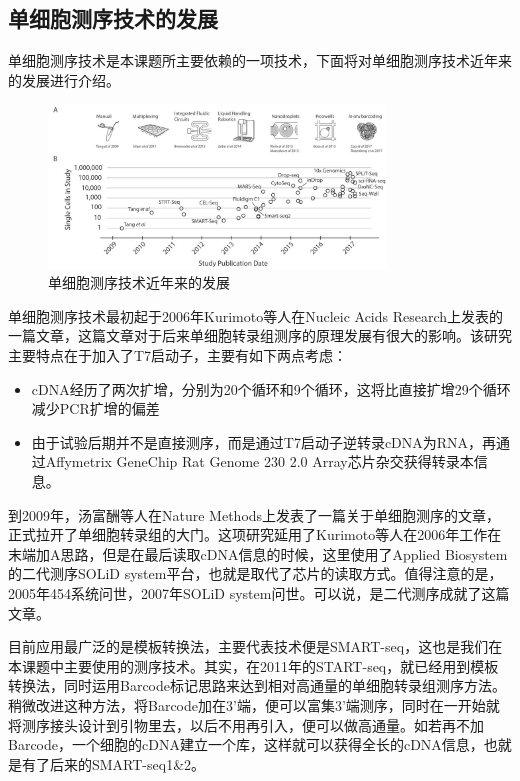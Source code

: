 \subsection{单细胞测序技术的发展}
  单细胞测序技术是本课题所主要依赖的一项技术，下面将对单细胞测序技术近年来的发展进行介绍。
\begin{figure}[!htb]
  \centering
  \includegraphics[width=0.8\textwidth]{figs/scseq-development.jpeg}
  \caption{单细胞测序技术近年来的发展}
  \label{fig:scseq-development}
\end{figure}

  单细胞测序技术最初起于2006年Kurimoto等人在Nucleic Acids Research上发表的一篇文章\cite{kurimoto2006improved}，这篇文章对于后来单细胞转录组测序的原理发展有很大的影响。该研究主要特点在于加入了T7启动子，主要有如下两点考虑：
\begin{itemize}
    \item cDNA经历了两次扩增，分别为20个循环和9个循环，这将比直接扩增29个循环减少PCR扩增的偏差
    \item 由于试验后期并不是直接测序，而是通过T7启动子逆转录cDNA为RNA，再通过Affymetrix GeneChip Rat Genome 230 2.0 Array芯片杂交获得转录本信息。
\end{itemize}

  到2009年，汤富酬等人在Nature Methods上发表了一篇关于单细胞测序的文章\cite{tang2009mrna}，正式拉开了单细胞转录组的大门。这项研究延用了Kurimoto等人在2006年工作\cite{kurimoto2006improved}在末端加A思路，但是在最后读取cDNA信息的时候，这里使用了Applied Biosystem的二代测序SOLiD system平台，也就是取代了芯片的读取方式。值得注意的是，2005年454系统问世，2007年SOLiD system问世。可以说，是二代测序成就了这篇文章。

  目前应用最广泛的是模板转换法，主要代表技术便是SMART-seq\cite{ramskold2012full,picelli2013smart}，这也是我们在本课题中主要使用的测序技术。其实，在2011年的START-seq\cite{islam2011characterization}，就已经用到模板转换法，同时运用Barcode标记思路来达到相对高通量的单细胞转录组测序方法。稍微改进这种方法，将Barcode加在3'端，便可以富集3'端测序，同时在一开始就将测序接头设计到引物里去，以后不用再引入，便可以做高通量。如若再不加Barcode，一个细胞的cDNA建立一个库，这样就可以获得全长的cDNA信息，也就是有了后来的SMART-seq1\&2。
